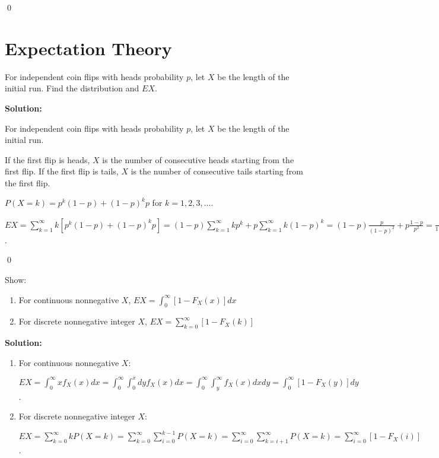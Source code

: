 \qed
\section{Expectation Theory}

\begin{problembox}
For independent coin flips with heads probability $p$, let $X$ be the length of the initial run. Find the distribution and $EX$.
\end{problembox}

\noindent\textbf{Solution:}

For independent coin flips with heads probability $p$, let $X$ be the length of the initial run.

If the first flip is heads, $X$ is the number of consecutive heads starting from the first flip.
If the first flip is tails, $X$ is the number of consecutive tails starting from the first flip.

$P(X = k) = p^k(1-p) + (1-p)^kp$ for $k = 1, 2, 3, \ldots$.

$EX = \sum_{k=1}^\infty k[p^k(1-p) + (1-p)^kp] = (1-p)\sum_{k=1}^\infty kp^k + p\sum_{k=1}^\infty k(1-p)^k = (1-p)\frac{p}{(1-p)^2} + p\frac{1-p}{p^2} = \frac{p}{1-p} + \frac{1-p}{p} = \frac{p^2 + (1-p)^2}{p(1-p)}$.


\qed
\begin{problembox}
Show:
\begin{enumerate}[label=(\alph*)]
    \item For continuous nonnegative $X$, $EX = \int_0^\infty [1-F_X(x)]dx$
    \item For discrete nonnegative integer $X$, $EX = \sum_{k=0}^\infty [1-F_X(k)]$
\end{enumerate}
\end{problembox}

\noindent\textbf{Solution:}
\begin{enumerate}[label=(\alph*)]
    \item For continuous nonnegative $X$:
    
    $EX = \int_0^\infty x f_X(x)dx = \int_0^\infty \int_0^x dy f_X(x)dx = \int_0^\infty \int_y^\infty f_X(x)dx dy = \int_0^\infty [1-F_X(y)]dy$.
    
    \item For discrete nonnegative integer $X$:
    
    $EX = \sum_{k=0}^\infty k P(X=k) = \sum_{k=0}^\infty \sum_{i=0}^{k-1} P(X=k) = \sum_{i=0}^\infty \sum_{k=i+1}^\infty P(X=k) = \sum_{i=0}^\infty [1-F_X(i)]$.
\end{enumerate}


